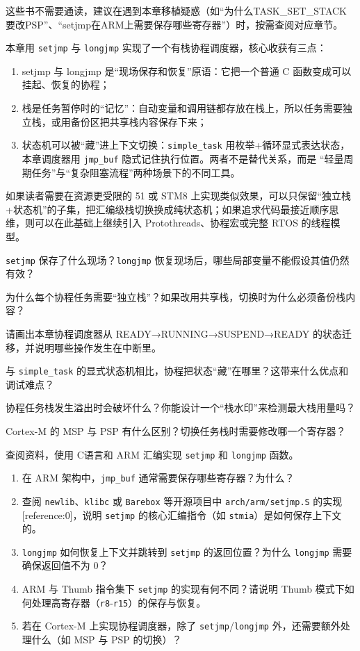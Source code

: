 这些书不需要通读，建议在遇到本章移植疑惑（如“为什么TASK\_SET\_STACK要改PSP”、“setjmp在ARM上需要保存哪些寄存器”）时，按需查阅对应章节。

本章用 \texttt{setjmp} 与 \texttt{longjmp} 实现了一个有栈协程调度器，核心收获有三点：

\begin{enumerate}
	\item setjmp 与 longjmp 是“现场保存和恢复”原语：它把一个普通 C 函数变成可以挂起、恢复的协程；
	\item 栈是任务暂停时的“记忆”：自动变量和调用链都存放在栈上，所以任务需要独立栈，或用备份区把共享栈内容保存下来；
	\item 状态机可以被“藏”进上下文切换：\texttt{simple\_task} 用枚举+循环显式表达状态，本章调度器用 \texttt{jmp\_buf} 隐式记住执行位置。两者不是替代关系，而是 “轻量周期任务”与“复杂阻塞流程”两种场景下的不同工具。
\end{enumerate}

如果读者需要在资源更受限的 51 或 STM8 上实现类似效果，可以只保留“独立栈+状态机”的子集，把汇编级栈切换换成纯状态机；如果追求代码最接近顺序思维，则可以在此基础上继续引入 Protothreads、协程宏或完整 RTOS 的线程模型。

\begin{problemset}
\item \texttt{setjmp} 保存了什么现场？\texttt{longjmp} 恢复现场后，哪些局部变量不能假设其值仍然有效？
\item 为什么每个协程任务需要“独立栈”？如果改用共享栈，切换时为什么必须备份栈内容？
\item 请画出本章协程调度器从 READY→RUNNING→SUSPEND→READY 的状态迁移，并说明哪些操作发生在中断里。
\item 与 \texttt{simple\_task} 的显式状态机相比，协程把状态“藏”在哪里？这带来什么优点和调试难点？
\item 协程任务栈发生溢出时会破坏什么？你能设计一个“栈水印”来检测最大栈用量吗？
\item Cortex-M 的 MSP 与 PSP 有什么区别？切换任务栈时需要修改哪一个寄存器？
\item 查阅资料，使用 C语言和 ARM 汇编实现 \texttt{setjmp} 和 \texttt{longjmp} 函数。
\begin{enumerate}
	\item 在 ARM 架构中，\texttt{jmp\_buf} 通常需要保存哪些寄存器？为什么？
	\item 查阅 \texttt{newlib}、\texttt{klibc} 或 \texttt{Barebox} 等开源项目中 \texttt{arch/arm/setjmp.S} 的实现[reference:0]，说明 \texttt{setjmp} 的核心汇编指令（如 \texttt{stmia}）是如何保存上下文的。
	\item \texttt{longjmp} 如何恢复上下文并跳转到 \texttt{setjmp} 的返回位置？为什么 \texttt{longjmp} 需要确保返回值不为 0？
	\item ARM 与 Thumb 指令集下 \texttt{setjmp} 的实现有何不同？请说明 Thumb 模式下如何处理高寄存器（\texttt{r8}-\texttt{r15}）的保存与恢复。
	\item 若在 Cortex-M 上实现协程调度器，除了 \texttt{setjmp}/\texttt{longjmp} 外，还需要额外处理什么（如 MSP 与 PSP 的切换）？
\end{enumerate}
\end{problemset}
